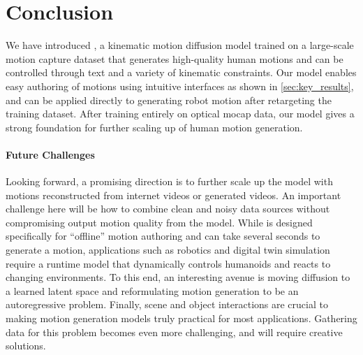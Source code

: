 \section{Conclusion}

We have introduced \model, a kinematic motion diffusion model trained on a large-scale motion capture dataset that generates high-quality human motions and can be controlled through text and a variety of kinematic constraints. 
Our model enables easy authoring of motions using intuitive interfaces as shown in \cref{sec:key_results}, and can be applied directly to generating robot motion after retargeting the training dataset. 
After training entirely on optical mocap data, our model gives a strong foundation for further scaling up of human motion generation. 

\paragraph{Future Challenges}
Looking forward, a promising direction is to further scale up the model with motions reconstructed from internet videos or generated videos. An important challenge here will be how to combine clean and noisy data sources without compromising output motion quality from the model. 
While \model is designed specifically for ``offline'' motion authoring and can take several seconds to generate a motion, applications such as robotics and digital twin simulation require a runtime model that dynamically controls humanoids and reacts to changing environments. To this end, an interesting avenue is moving diffusion to a learned latent space and reformulating motion generation to be an autoregressive problem. 
Finally, scene and object interactions are crucial to making motion generation models truly practical for most applications. Gathering data for this problem becomes even more challenging, and will require creative solutions.
